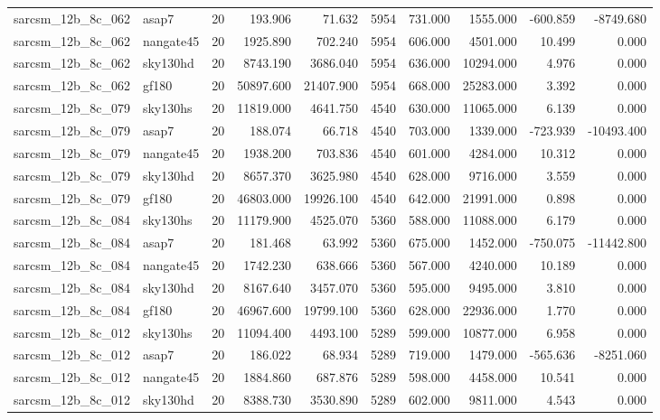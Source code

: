 \begin{longtable}{llrrrrrrrr}
sarcsm\_12b\_8c\_062 & asap7 & 20 & 193.906 & 71.632 & 5954 & 731.000 & 1555.000 & -600.859 & -8749.680 \\
sarcsm\_12b\_8c\_062 & nangate45 & 20 & 1925.890 & 702.240 & 5954 & 606.000 & 4501.000 & 10.499 & 0.000 \\
sarcsm\_12b\_8c\_062 & sky130hd & 20 & 8743.190 & 3686.040 & 5954 & 636.000 & 10294.000 & 4.976 & 0.000 \\
sarcsm\_12b\_8c\_062 & gf180 & 20 & 50897.600 & 21407.900 & 5954 & 668.000 & 25283.000 & 3.392 & 0.000 \\
sarcsm\_12b\_8c\_079 & sky130hs & 20 & 11819.000 & 4641.750 & 4540 & 630.000 & 11065.000 & 6.139 & 0.000 \\
sarcsm\_12b\_8c\_079 & asap7 & 20 & 188.074 & 66.718 & 4540 & 703.000 & 1339.000 & -723.939 & -10493.400 \\
sarcsm\_12b\_8c\_079 & nangate45 & 20 & 1938.200 & 703.836 & 4540 & 601.000 & 4284.000 & 10.312 & 0.000 \\
sarcsm\_12b\_8c\_079 & sky130hd & 20 & 8657.370 & 3625.980 & 4540 & 628.000 & 9716.000 & 3.559 & 0.000 \\
sarcsm\_12b\_8c\_079 & gf180 & 20 & 46803.000 & 19926.100 & 4540 & 642.000 & 21991.000 & 0.898 & 0.000 \\
sarcsm\_12b\_8c\_084 & sky130hs & 20 & 11179.900 & 4525.070 & 5360 & 588.000 & 11088.000 & 6.179 & 0.000 \\
sarcsm\_12b\_8c\_084 & asap7 & 20 & 181.468 & 63.992 & 5360 & 675.000 & 1452.000 & -750.075 & -11442.800 \\
sarcsm\_12b\_8c\_084 & nangate45 & 20 & 1742.230 & 638.666 & 5360 & 567.000 & 4240.000 & 10.189 & 0.000 \\
sarcsm\_12b\_8c\_084 & sky130hd & 20 & 8167.640 & 3457.070 & 5360 & 595.000 & 9495.000 & 3.810 & 0.000 \\
sarcsm\_12b\_8c\_084 & gf180 & 20 & 46967.600 & 19799.100 & 5360 & 628.000 & 22936.000 & 1.770 & 0.000 \\
sarcsm\_12b\_8c\_012 & sky130hs & 20 & 11094.400 & 4493.100 & 5289 & 599.000 & 10877.000 & 6.958 & 0.000 \\
sarcsm\_12b\_8c\_012 & asap7 & 20 & 186.022 & 68.934 & 5289 & 719.000 & 1479.000 & -565.636 & -8251.060 \\
sarcsm\_12b\_8c\_012 & nangate45 & 20 & 1884.860 & 687.876 & 5289 & 598.000 & 4458.000 & 10.541 & 0.000 \\
sarcsm\_12b\_8c\_012 & sky130hd & 20 & 8388.730 & 3530.890 & 5289 & 602.000 & 9811.000 & 4.543 & 0.000 \\

\end{longtable}
